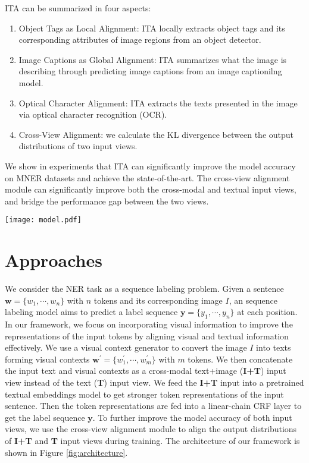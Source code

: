 \documentclass[11pt]{article}
\def\vw{{\bm{w}}}
\def\vy{{\bm{y}}}
\begin{document}
ITA can be summarized in four aspects:
\begin{enumerate}[leftmargin=*]
    \item Object Tags as Local Alignment: ITA locally extracts object tags and its corresponding attributes of image regions from an object detector.
    \item Image Captions as Global Alignment: ITA summarizes what the image is describing through predicting image captions from an image captionilng model.
    \item Optical Character Alignment: ITA extracts the texts presented in the image via optical character recognition (OCR).
    \item Cross-View Alignment: we calculate the KL divergence between the output distributions of two input views.
\end{enumerate}
We show in experiments that ITA can significantly improve the model accuracy on MNER datasets and achieve the state-of-the-art. The cross-view alignment module can significantly improve both the cross-modal and textual input views, and bridge the performance gap between the two views. 



\begin{figure*}[ht]
	\centering
	\texttt{[image: model.pdf]}
	\caption{The architecture of ITA. ITA aligns an image into object tags, image captions and texts from OCR. ITA takes them as visual contexts and then feeds them together with the input texts into the transformer-based embeddings. In the cross-view alignment module, ITA minimizes the distance between the output distribution of cross-modal inputs and textual inputs. }
	\label{fig:architecture}
\end{figure*}


\section{Approaches}
We consider the NER task as a sequence labeling problem. Given a sentence $\vw = \{w_1, \cdots, w_n\}$ with $n$ tokens and its corresponding image $I$, an sequence labeling model aims to predict a label sequence $\vy = \{y_1, \cdots, y_n\}$ at each position.
In our framework, we focus on incorporating visual information to improve the representations of the input tokens by aligning visual and textual information effectively. We use a visual context generator to convert the image $I$ into texts forming visual contexts $\vw^\prime = \{w_1^\prime, \cdots, w_m^\prime\}$ with $m$ tokens. We then concatenate the input text and visual contexts as a cross-modal text+image (\textbf{I+T}) input view instead of the text (\textbf{T}) input view. We feed the \textbf{I+T} input into a pretrained textual embeddings model to get stronger token representations of the input sentence. Then the token representations are fed into a linear-chain CRF layer to get the label sequence $\vy$. To further improve the model accuracy of both input views, we use the cross-view alignment module to align the output distributions of \textbf{I+T} and \textbf{T} input views during training. The architecture of our framework is shown in Figure \ref{fig:architecture}.
\end{document}
